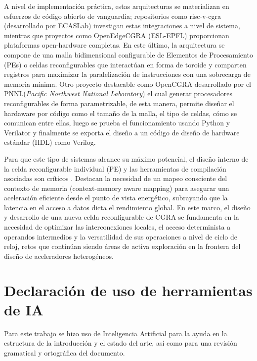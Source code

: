 \documentclass[conference]{IEEEtran}
\begin{document}
A nivel de implementación práctica, estas arquitecturas se materializan en esfuerzos de código abierto de vanguardia; repositorios como risc-v-cgra (desarrollado por ECASLab) investigan estas integraciones a nivel de sistema, mientras que proyectos como OpenEdgeCGRA (ESL-EPFL) proporcionan plataformas open-hardware completas. En este último, la arquitectura se compone de una malla bidimensional configurable de Elementos de Procesamiento (PEs) o celdas reconfigurables que interactúan en forma de toroide y comparten registros para maximizar la paralelización de instrucciones con una sobrecarga de memoria mínima. Otro proyecto destacable como OpenCGRA desarrollado por el PNNL(\textit{Pacific Northwest National Laboratory}) el cual generar procesadores reconfigurables de forma parametrizable, de esta manera, permite diseñar el hardaware por código como el tamaño de la malla, el tipo de celdas, cómo se comunican entre ellas, luego se prueba el funcionamiento usando Python y Verilator y finalmente se exporta el diseño a un código de diseño de hardware estándar (HDL) como Verilog.

Para que este tipo de sistemas alcance su máximo potencial, el diseño interno de la celda reconfigurable individual (PE) y las herramientas de compilación asociadas son críticos \cite{satyajit}. Destacan la necesidad de un mapeo consciente del contexto de memoria (context-memory aware mapping) para asegurar una aceleración eficiente desde el punto de vista energético, subrayando que la latencia en el acceso a datos dicta el rendimiento global. En este marco, el diseño y desarrollo de una nueva celda reconfigurable de CGRA se fundamenta en la necesidad de optimizar las interconexiones locales, el acceso determinista a operandos intermedios y la versatilidad de sus operaciones a nivel de ciclo de reloj, retos que continúan siendo áreas de activa exploración en la frontera del diseño de aceleradores heterogéneos.


\section*{Declaración de uso de herramientas de IA}
Para este trabajo se hizo uso de Inteligencia Artificial para la ayuda en la estructura de la introducción y el estado del arte, así como para una revisión gramatical y ortográfica del documento.



\end{document}
